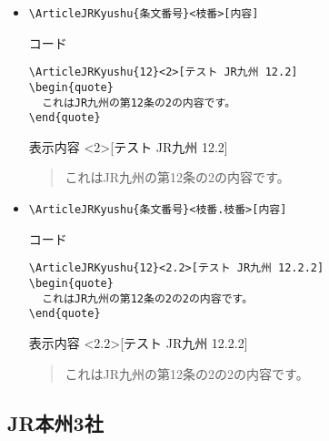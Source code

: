 \documentclass[oneside,10pt,a4paper]{jsarticle}
\begin{document}
\begin{itemize}
    \item \verb|\ArticleJRKyushu{条文番号}<枝番>[内容]|
      \begin{itembox}[l]{コード}
        {\footnotesize\begin{verbatim}
\ArticleJRKyushu{12}<2>[テスト JR九州 12.2]
\begin{quote}
  これはJR九州の第12条の2の内容です。
\end{quote}\end{verbatim}}
      \end{itembox}
      \begin{itembox}[l]{表示内容}
        <2>[テスト JR九州 12.2]
        \begin{quote}
          これはJR九州の第12条の2の内容です。
        \end{quote}
      \end{itembox}
    \item \verb|\ArticleJRKyushu{条文番号}<枝番.枝番>[内容]|
      \begin{itembox}[l]{コード}
        {\footnotesize\begin{verbatim}
\ArticleJRKyushu{12}<2.2>[テスト JR九州 12.2.2]
\begin{quote}
  これはJR九州の第12条の2の2の内容です。
\end{quote}\end{verbatim}}
      \end{itembox}
      \begin{itembox}[l]{表示内容}
        <2.2>[テスト JR九州 12.2.2]
        \begin{quote}
          これはJR九州の第12条の2の2の内容です。
        \end{quote}
      \end{itembox}
  \end{itemize}

  \newpage

  \subsection{JR本州3社}
\end{document}
